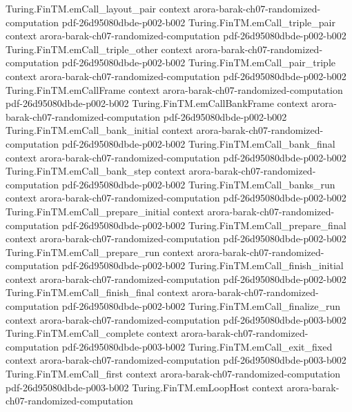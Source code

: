 \begin{theorem}
\proofstep
  {Turing.FinTM.emCall_layout_pair}
  {context}
  {arora-barak-ch07-randomized-computation}
  {pdf-26d95080dbde-p002-b002}
\proofstep
  {Turing.FinTM.emCall_triple_pair}
  {context}
  {arora-barak-ch07-randomized-computation}
  {pdf-26d95080dbde-p002-b002}
\proofstep
  {Turing.FinTM.emCall_triple_other}
  {context}
  {arora-barak-ch07-randomized-computation}
  {pdf-26d95080dbde-p002-b002}
\proofstep
  {Turing.FinTM.emCall_pair_triple}
  {context}
  {arora-barak-ch07-randomized-computation}
  {pdf-26d95080dbde-p002-b002}
\proofstep
  {Turing.FinTM.emCallFrame}
  {context}
  {arora-barak-ch07-randomized-computation}
  {pdf-26d95080dbde-p002-b002}
\proofstep
  {Turing.FinTM.emCallBankFrame}
  {context}
  {arora-barak-ch07-randomized-computation}
  {pdf-26d95080dbde-p002-b002}
\proofstep
  {Turing.FinTM.emCall_bank_initial}
  {context}
  {arora-barak-ch07-randomized-computation}
  {pdf-26d95080dbde-p002-b002}
\proofstep
  {Turing.FinTM.emCall_bank_final}
  {context}
  {arora-barak-ch07-randomized-computation}
  {pdf-26d95080dbde-p002-b002}
\proofstep
  {Turing.FinTM.emCall_bank_step}
  {context}
  {arora-barak-ch07-randomized-computation}
  {pdf-26d95080dbde-p002-b002}
\proofstep
  {Turing.FinTM.emCall_banks_run}
  {context}
  {arora-barak-ch07-randomized-computation}
  {pdf-26d95080dbde-p002-b002}
\proofstep
  {Turing.FinTM.emCall_prepare_initial}
  {context}
  {arora-barak-ch07-randomized-computation}
  {pdf-26d95080dbde-p002-b002}
\proofstep
  {Turing.FinTM.emCall_prepare_final}
  {context}
  {arora-barak-ch07-randomized-computation}
  {pdf-26d95080dbde-p002-b002}
\proofstep
  {Turing.FinTM.emCall_prepare_run}
  {context}
  {arora-barak-ch07-randomized-computation}
  {pdf-26d95080dbde-p002-b002}
\proofstep
  {Turing.FinTM.emCall_finish_initial}
  {context}
  {arora-barak-ch07-randomized-computation}
  {pdf-26d95080dbde-p002-b002}
\proofstep
  {Turing.FinTM.emCall_finish_final}
  {context}
  {arora-barak-ch07-randomized-computation}
  {pdf-26d95080dbde-p002-b002}
\proofstep
  {Turing.FinTM.emCall_finalize_run}
  {context}
  {arora-barak-ch07-randomized-computation}
  {pdf-26d95080dbde-p003-b002}
\proofstep
  {Turing.FinTM.emCall_complete}
  {context}
  {arora-barak-ch07-randomized-computation}
  {pdf-26d95080dbde-p003-b002}
\proofstep
  {Turing.FinTM.emCall_exit_fixed}
  {context}
  {arora-barak-ch07-randomized-computation}
  {pdf-26d95080dbde-p003-b002}
\proofstep
  {Turing.FinTM.emCall_first}
  {context}
  {arora-barak-ch07-randomized-computation}
  {pdf-26d95080dbde-p003-b002}
\proofstep
  {Turing.FinTM.emLoopHost}
  {context}
  {arora-barak-ch07-randomized-computation}

\end{theorem}
